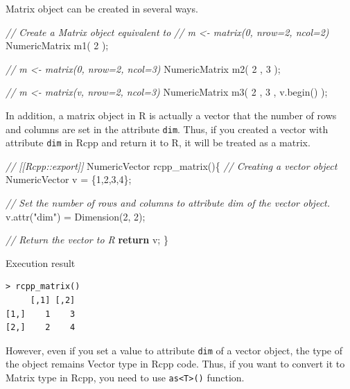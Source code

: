\documentclass[]{book}
\newenvironment{Shaded}{\begin{snugshade}}{\end{snugshade}}
\newcommand{\CommentTok}[1]{\textcolor[rgb]{0.56,0.35,0.01}{\textit{#1}}}
\newcommand{\ControlFlowTok}[1]{\textcolor[rgb]{0.13,0.29,0.53}{\textbf{#1}}}
\newcommand{\DecValTok}[1]{\textcolor[rgb]{0.00,0.00,0.81}{#1}}
\newcommand{\NormalTok}[1]{#1}
\newcommand{\StringTok}[1]{\textcolor[rgb]{0.31,0.60,0.02}{#1}}
\begin{document}
Matrix object can be created in several ways.

\begin{Shaded}
\begin{Highlighting}[]
\CommentTok{// Create a Matrix object equivalent to}
\CommentTok{// m <- matrix(0, nrow=2, ncol=2)}
\NormalTok{NumericMatrix m1( }\DecValTok{2}\NormalTok{ );}

\CommentTok{// m <- matrix(0, nrow=2, ncol=3)}
\NormalTok{NumericMatrix m2( }\DecValTok{2}\NormalTok{ , }\DecValTok{3}\NormalTok{ );}

\CommentTok{// m <- matrix(v, nrow=2, ncol=3)}
\NormalTok{NumericMatrix m3( }\DecValTok{2}\NormalTok{ , }\DecValTok{3}\NormalTok{ , v.begin() );}
\end{Highlighting}
\end{Shaded}

In addition, a matrix object in R is actually a vector that the number of rows and columns are set in the attribute \texttt{dim}. Thus, if you created a vector with attribute \texttt{dim} in Rcpp and return it to R, it will be treated as a matrix.

\begin{Shaded}
\begin{Highlighting}[]
\CommentTok{// [[Rcpp::export]]}
\NormalTok{NumericVector rcpp_matrix()\{}
    \CommentTok{// Creating a vector object}
\NormalTok{    NumericVector v = \{}\DecValTok{1}\NormalTok{,}\DecValTok{2}\NormalTok{,}\DecValTok{3}\NormalTok{,}\DecValTok{4}\NormalTok{\};}

    \CommentTok{// Set the number of rows and columns to attribute dim of the vector object.}
\NormalTok{    v.attr(}\StringTok{"dim"}\NormalTok{) = Dimension(}\DecValTok{2}\NormalTok{, }\DecValTok{2}\NormalTok{);}

    \CommentTok{// Return the vector to R}
    \ControlFlowTok{return}\NormalTok{ v;}
\NormalTok{\}}
\end{Highlighting}
\end{Shaded}

Execution result

\begin{verbatim}
> rcpp_matrix()
     [,1] [,2]
[1,]    1    3
[2,]    2    4
\end{verbatim}

However, even if you set a value to attribute \texttt{dim} of a vector object, the type of the object remains Vector type in Rcpp code. Thus, if you want to convert it to Matrix type in Rcpp, you need to use \texttt{as\textless{}T\textgreater{}()} function.
\end{document}
